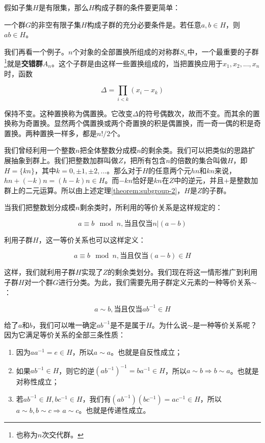 \documentclass[b5paper]{ctexart}
\begin{document}
假如子集$H$是有限集，那么$H$构成子群的条件要更简单：

\begin{theorem}
一个群$G$的非空有限子集$H$构成子群的充分必要条件是。若任意$a, b \in H$，则$ab \in H$。
\end{theorem}

我们再看一个例子。$n$个对象的全部置换所组成的对称群$S_n$中，一个最重要的子群\footnote{也称为$n$次交代群。}就是\textbf{交错群}$A_n$。这个子群是由这样一些置换组成的，当把置换应用于$x_1, x_2, ..., x_n$时，函数

\[
\Delta = \displaystyle \prod_{i < k} (x_i - x_k)
\]

保持不变。这种置换称为偶置换。它改变$\Delta$的符号偶数次，故而不变。而其余的置换称为奇置换。显然两个偶置换或两个奇置换的积是偶置换，而一奇一偶的积是奇置换。两种置换一样多，都是$n!/2$个。

我们曾经利用一个整数$n$把全体整数分成模$n$的剩余类。我们可以把类似的思路扩展抽象到群上。我们把整数加群叫做$Z$，把所有包含$n$的倍数的集合叫做$H$，即$H = \{ kn \}$，其中$k = 0, \pm 1, \pm 2, ...$。那么对于$H$的任意两个元$hn$和$kn$来说，$hn + (-k)n = (h - k)n \in H$。而$-kn$恰好是$kn$在$Z$中的逆元，并且$+$是整数加群上的二元运算。所以由上述定理\ref{theorem:subgroup-2}，$H$是$Z$的子群。

当我们把整数划分成模$n$剩余类时，所利用的等价关系是这样规定的：

\[
a \equiv b \mod n, \text{当且仅当} n | (a - b)
\]

利用子群$H$，这一等价关系也可以这样定义：

\[
a \equiv b \mod n, \text{当且仅当} (a - b) \in H
\]

这样，我们就利用子群$H$实现了$Z$的剩余类划分。我们现在将这一情形推广到利用子群$H$对一个群$G$进行分类。为此，我们需要先用子群定义元素的一种等价关系$\sim$：

\[
a \sim b, \text{当且仅当} ab^{-1} \in H
\]

给了$a$和$b$，我们可以唯一确定$ab^{-1}$是不是属于$H$。为什么说$\sim$是一种等价关系呢？因为它满足等价关系的全部三条性质：

\begin{enumerate}
\item 因为$aa^{-1} = e \in H$，所以$a \sim a$。也就是自反性成立；
\item 如果$ab^{-1} \in H$，则它的逆$(ab^{-1})^{-1}= ba^{-1} \in H$，所以$a \sim b \Rightarrow b \sim a$。也就是对称性成立；
\item 若$ab^{-1} \in H, bc^{-1} \in H$，我们有$(ab^{-1})(bc^{-1}) = ac^{-1} \in H$，所以$a \sim b, b \sim c \Rightarrow a \sim c$。也就是传递性成立。
\end{enumerate}
\end{document}
